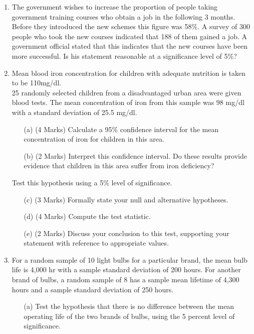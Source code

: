 \documentclass[]{article}
\begin{document}
\begin{enumerate}
\item The government wishes to increase the proportion of people taking government training courses who obtain a job in the following 3 months. Before they introduced the new schemes this figure was 58\%. A survey of 300 people who took the new courses indicated that 188 of them gained a job. A government official stated that this indicates that the new courses have been more successful. 
Is his statement reasonable at a significance level of 5\%?

\item Mean blood iron concentration for children with adequate nutrition is taken to be 110mg/dl. \\ 25 randomly selected children from a disadvantaged urban area were given blood tests. The mean concentration of iron from this sample was 98 mg/dl with a standard deviation of 25.5 mg/dl.
\begin{itemize}
	\item[(a)] (4 Marks) Calculate a 95\% confidence interval for the mean concentration of iron for children in this area. 
	\item[(b)](2 Marks) Interpret this confidence interval.  Do these results provide evidence that children in this area suffer from iron deficiency? 
\end{itemize}
\medskip
Test this hypothesis using a 5\% level of significance. 

\begin{itemize}
	\item[(c)](3 Marks) Formally state your null and alternative hypotheses.
	\item[(d)](4 Marks) Compute the test statistic.
	\item[(e)](2 Marks) Discuss your conclusion to this test, supporting your statement with reference to appropriate values.
\end{itemize}

\item For a random sample of 10 light bulbs for a particular brand, the mean bulb life is 4,000 hr with a sample
standard deviation of 200 hours. For another brand of bulbs, a random sample of 8 has a sample mean lifetime of 4,300 hours and a sample
standard deviation of 250 hours.\\

\begin{itemize}
	\item[(a)]Test the hypothesis that there is no difference between the mean operating life of the two brands of bulbs,
using the 5 percent level of significance.
\end{itemize}





\end{enumerate}
\end{document}
